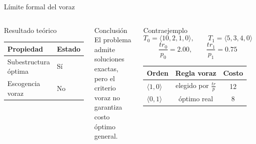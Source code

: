 \documentclass[aspectratio=169]{beamer}
\begin{document}
\begin{frame}{L\'imite formal del voraz}
  \begin{columns}[T,onlytextwidth]
    \begin{block}{Resultado te\'orico}
      \begin{tabular}{@{}ll@{}}
        \toprule
        Propiedad & Estado \\
        \midrule
        Subestructura \'optima & S\'i \\
        Escogencia voraz & No \\
        \bottomrule
      \end{tabular}
    \end{block}

    \begin{alertblock}{Conclusi\'on}
      El problema admite soluciones exactas, pero el criterio voraz no garantiza costo \'optimo general.
    \end{alertblock}

    \small
    \begin{block}{Contraejemplo}
      \[
      T_0=\langle 10,2,1,0\rangle,
      \qquad
      T_1=\langle 5,3,4,0\rangle
      \]
      \[
      \frac{tr_0}{p_0}=2.00,
      \qquad
      \frac{tr_1}{p_1}=0.75
      \]
      \begin{tabular}{@{}lcc@{}}
        \toprule
        Orden & Regla voraz & Costo \\
        \midrule
        \(\langle 1,0\rangle\) & elegido por \(\frac{tr}{p}\) & 12 \\
        \(\langle 0,1\rangle\) & \'optimo real & 8 \\
        \bottomrule
      \end{tabular}
    \end{block}
  \end{columns}
\end{frame}
\end{document}
